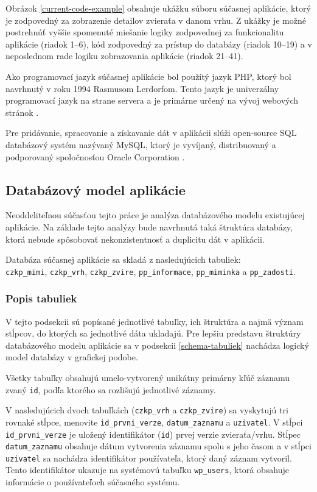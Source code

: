 Obrázok \ref{current-code-example} obsahuje ukážku súboru súčasnej aplikácie, ktorý je zodpovedný za zobrazenie detailov zvieraťa v danom vrhu. Z ukážky je možné postrehnúť vyššie spomenuté miešanie logiky zodpovednej za funkcionalitu aplikácie (riadok 1--6), kód zodpovedný za prístup do databázy (riadok 10--19) a v neposlednom rade logiku zobrazovania aplikácie (riadok 21--41).

Ako programovací jazyk súčasnej aplikácie bol použítý jazyk PHP, ktorý bol navrhnutý v roku 1994 Rasmusom Lerdorfom. Tento jazyk je univerzálny programovací jazyk na strane servera a je primárne určený na vývoj webových stránok \cite{co-je-php}.

Pre pridávanie, spracovanie a získavanie dát v aplikácii slúži open-source SQL databázový systém nazývaný MySQL, ktorý je vyvíjaný, distribuovaný a podporovaný spoločnosťou Oracle Corporation \cite{co-je-mysql}. 

\subsection{Databázový model aplikácie}\label{sucasny-model-db}
Neoddeliteľnou súčasťou tejto práce je analýza databázového modelu existujúcej aplikácie. Na základe tejto analýzy bude navrhnutá taká štruktúra databázy, ktorá nebude spôsobovať nekonzistentnosť a duplicitu dát v aplikácii.

Databáza súčasnej aplikácie sa skladá z nasledujúcich tabuliek: \\ \texttt{czkp_mimi}, \texttt{czkp_vrh}, \texttt{czkp_zvire}, \texttt{pp_informace}, \texttt{pp_miminka} a \texttt{pp_zadosti}.

\subsubsection{Popis tabuliek}
V tejto podsekcii sú popísané jednotlivé tabuľky, ich štruktúra a najmä význam stĺpcov, do ktorých sa jednotlivé dáta ukladajú.
Pre lepšiu predstavu štruktúry databázového modelu aplikácie sa v podsekcii \ref{schema-tabuliek} nachádza logický model databázy v grafickej podobe. 

Všetky tabuľky obsahujú umelo-vytvorený unikátny primárny kľúč záznamu zvaný \texttt{id}, podľa ktorého sa rozlišujú jednotlivé záznamy.

V nasledujúcich dvoch tabuľkách (\texttt{czkp_vrh} a \texttt{czkp_zvire}) sa vyskytujú tri rovnaké stĺpce, menovite \texttt{id_prvni_verze},  \texttt{datum_zaznamu} a  \texttt{uzivatel}. V stĺpci \texttt{id_prvni_verze} je uložený identifikátor (\texttt{id}) prvej verzie zvieraťa/vrhu. Stĺpec \texttt{datum_zaznamu} obsahuje dátum vytvorenia záznamu spolu s jeho časom a v stĺpci \texttt{uzivatel} sa nachádza identifikátor používateľa, ktorý daný záznam vytvoril. Tento identifikátor ukazuje na systémovú tabuľku \texttt{wp_users}, ktorá obsahuje informácie o používateľoch súčasného systému.

